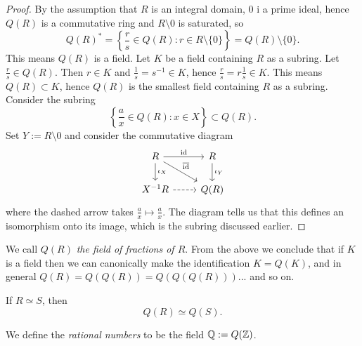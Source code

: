 \begin{proof}
    By the assumption that $R$ is an integral domain, $0$ i a prime ideal, hence $Q(R)$ is a commutative ring and $R\setminus 0$ is saturated, so 
    $$Q(R)^\ast = \left\{ \frac{r}{s}\in Q(R) : r\in R\setminus\{0\} \right\} = Q(R)\setminus\{0\}.$$
    This means $Q(R)$ is a field. Let $K$ be a field containing $R$ as a subring. Let $\frac{r}{s}\in Q(R)$. Then $r \in K$ and $\frac{1}{s}=s^{-1} \in K$, hence $\frac{r}{s} = r \frac{1}{s} \in K$. This means $Q(R) \subset K$, hence $Q(R)$ is the smallest field containing $R$ as a subring. Consider the subring 
    $$
        \left\{\frac{a}{x}\in Q(R) : x\in X \right\}\subset Q(R).
    $$
    Set $Y := R\setminus 0$ and consider the commutative diagram
    $$
        \begin{tikzcd}
            R \arrow[r,"\id"]\arrow[d,"\iota_X"]\arrow[rd,"\overline{\id}"] & R \arrow[d,"\iota_Y"]\\
            X^{-1}R \arrow[r,dashrightarrow] & Q(R)
        \end{tikzcd}
    $$
    where the dashed arrow takes $\frac{a}{x}\mapsto \frac{a}{x}$. The diagram tells us that this defines an isomorphism onto its image, which is the subring discussed earlier.
\end{proof}
\begin{remark}
    We call $Q(R)$ \emph{the field of fractions of $R$}.  From the above we conclude that if $K$ is a field then we can canonically make the identification $K = Q(K)$, and in general $Q(R) =  Q(Q(R))=Q(Q(Q(R)))...$ and so on.
\end{remark}
\begin{corollary}
    If $R\simeq S$, then 
    $$
        Q(R)\simeq Q(S).
    $$
\end{corollary}
\begin{definition}
    We define the \textit{rational numbers} to be the field $\mathbb{Q} := Q(\mathbb{Z})$.
\end{definition}
